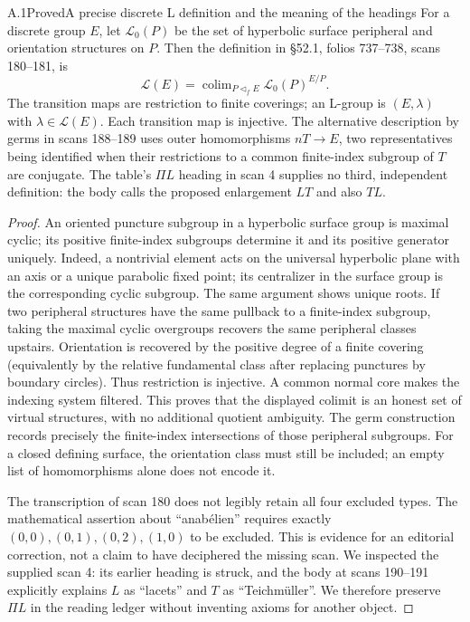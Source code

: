 \begin{statement}{A.1}{Proved}{A precise discrete L definition and the meaning of the headings}
For a discrete group $E$, let $\mathcal L_0(P)$ be the set of hyperbolic
surface peripheral and orientation structures on $P$. Then the definition
in \S52.1, folios 737--738, scans 180--181, is
\[
 \mathcal L(E)=\mathop{\mathrm{colim}}_{P\triangleleft_f E}
             \mathcal L_0(P)^{E/P}.
\]
The transition maps are restriction to finite coverings; an L-group is
$(E,\lambda)$ with $\lambda\in\mathcal L(E)$. Each transition map is
injective. The alternative description by germs in scans 188--189 uses
outer homomorphisms $nT\to E$, two representatives being identified when
their restrictions to a common finite-index subgroup of $T$ are conjugate.
The table's $\Pi L$ heading in scan 4 supplies no third, independent
definition: the body calls the proposed enlargement $LT$ and also $TL$.
\end{statement}
\begin{proof}
An oriented puncture subgroup in a hyperbolic surface group is maximal
cyclic; its positive finite-index subgroups determine it and its positive
generator uniquely. Indeed, a nontrivial element acts on the universal
hyperbolic plane with an axis or a unique parabolic fixed point; its
centralizer in the surface group is the corresponding cyclic subgroup.
The same argument shows unique roots. If two peripheral structures have
the same pullback to a finite-index subgroup, taking the maximal cyclic
overgroups recovers the same peripheral classes upstairs. Orientation is
recovered by the positive degree of a finite covering (equivalently by
the relative fundamental class after replacing punctures by boundary
circles). Thus restriction is injective. A common normal core makes the
indexing system filtered. This proves that the displayed colimit is an
honest set of virtual structures, with no additional quotient ambiguity.
The germ construction records precisely the finite-index intersections
of those peripheral subgroups. For a closed defining surface, the
orientation class must still be included; an empty list of homomorphisms
alone does not encode it.

The transcription of scan 180 does not legibly retain all four excluded
types. The mathematical assertion about ``anab\'elien'' requires exactly
$(0,0),(0,1),(0,2),(1,0)$ to be excluded. This is evidence for an editorial
correction, not a claim to have deciphered the missing scan. We inspected
the supplied scan 4: its earlier heading is struck, and the body at
scans 190--191 explicitly explains $L$ as ``lacets'' and $T$ as
``Teichm\"uller''. We therefore preserve $\Pi L$ in the reading ledger
without inventing axioms for another object.
\end{proof}

